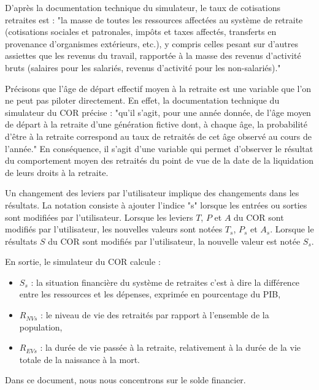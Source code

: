 \documentclass[10pt]{article}
\begin{document}
D'après la documentation technique du simulateur, 
le taux de cotisations retraites est : "la masse de toutes les ressources affectées au système
de retraite (cotisations sociales et patronales, impôts et taxes affectés, transferts en provenance
d’organismes extérieurs, etc.), y compris celles pesant sur d’autres assiettes 
que les revenus du travail, rapportée à la masse des revenus d'activité bruts (salaires pour les salariés, revenus d’activité pour les non-salariés)." 

Précisons que l'âge de départ effectif moyen à la retraite est une variable que l'on ne peut pas 
piloter directement. 
En effet, la documentation technique du simulateur du COR précise : "qu'il s’agit, 
pour une année donnée, de l’âge moyen 
de départ à la retraite d’une génération fictive dont, à chaque âge, 
la probabilité d’être à la retraite correspond au taux de retraités de cet âge observé 
au cours de l’année." 
En conséquence, il s'agit d'une variable qui permet d'observer le résultat du comportement 
moyen des retraités du point de vue de la date de la liquidation de leurs droits à la 
retraite. 

Un changement des leviers par l'utilisateur implique des changements 
dans les résultats. 
La notation consiste à ajouter l'indice "s" lorsque les entrées ou sorties 
sont modifiées par l'utilisateur. 
Lorsque les leviers $T$, $P$ et $A$ du COR sont modifiés par l'utilisateur, les nouvelles valeurs sont notées $T_s$, $P_s$ et $A_s$. 
Lorsque le résultats $S$ du COR sont modifiés par l'utilisateur, 
la nouvelle valeur est notée $S_s$.

En sortie, le simulateur du COR calcule :
\begin{itemize}
\item $S_s$ : la situation financière du système de retraites c'est à dire la différence 
entre les ressources et les dépenses, exprimée en pourcentage du PIB, 
\item $R_{NVs}$ : le niveau de vie des retraités par rapport à l’ensemble de la population, 
\item $R_{EVs}$ : la durée de vie passée à la retraite, relativement à la durée de la vie totale 
de la naissance à la mort. 
\end{itemize}
Dans ce document, nous nous concentrons sur le solde financier. 

\end{document}
